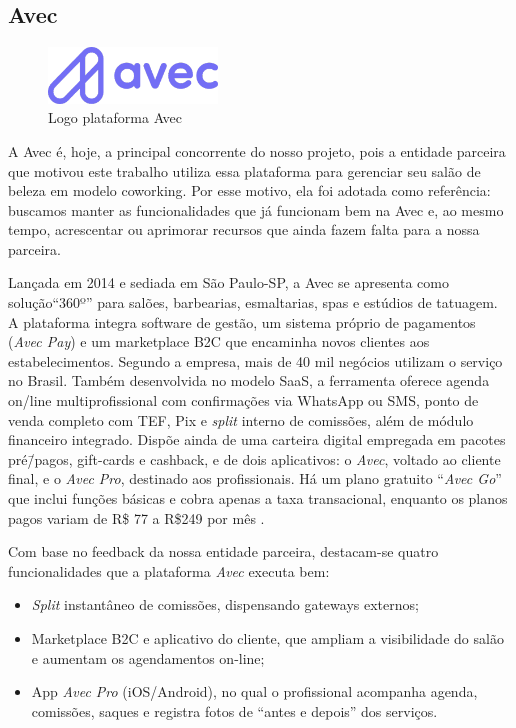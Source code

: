 \subsection{Avec}

\begin{figure}[htb]
	\centering
	\includegraphics[width=0.4\textwidth]{cap01-Introducao/Images/1.4.3_Avec}
	\caption{Logo plataforma Avec}
	\label{fig:Avec}
\end{figure}

A Avec é, hoje, a principal concorrente do nosso projeto, pois a entidade parceira que motivou este trabalho utiliza essa plataforma para gerenciar seu salão de beleza em modelo coworking. Por esse motivo, ela foi adotada como referência: buscamos manter as funcionalidades que já funcionam bem na Avec e, ao mesmo tempo, acrescentar ou aprimorar recursos que ainda fazem falta para a nossa parceira.

Lançada em 2014 e sediada em São Paulo-SP, a Avec se apresenta como solução``360º'' para salões, barbearias, esmaltarias, spas e estúdios de tatuagem. A plataforma integra software de gestão, um sistema próprio de pagamentos (\emph{Avec Pay}) e um marketplace B2C que encaminha novos clientes aos estabelecimentos. Segundo a empresa, mais de 40 mil negócios utilizam o serviço no
Brasil. Também desenvolvida no modelo SaaS, a ferramenta oferece agenda on\-/line multiprofissional com confirmações via WhatsApp ou SMS, ponto de venda completo com TEF, Pix e \emph{split} interno de comissões, além de módulo financeiro integrado. Dispõe ainda de uma carteira digital empregada em pacotes pré\=/pagos, gift-cards
e cashback, e de dois aplicativos: o \emph{Avec}, voltado ao cliente final, e o \emph{Avec Pro}, destinado aos profissionais. Há um plano gratuito ``\emph{Avec Go}'' que inclui funções básicas e cobra apenas a taxa transacional, enquanto os planos pagos variam de R\$ 77 a
R\$249 por mês \cite{Avec}.


Com base no feedback da nossa entidade parceira, destacam-se quatro funcionalidades que
a plataforma \emph{Avec} executa bem:
\begin{itemize}
	\item \emph{Split} instantâneo de comissões, dispensando gateways externos;
	\item Marketplace B2C e aplicativo do cliente, que ampliam a visibilidade do salão e aumentam os agendamentos on-line;
	\item App \emph{Avec Pro} (iOS/Android), no qual o profissional acompanha agenda,
	comissões, saques e registra fotos de “antes e depois” dos serviços.
\end{itemize}

